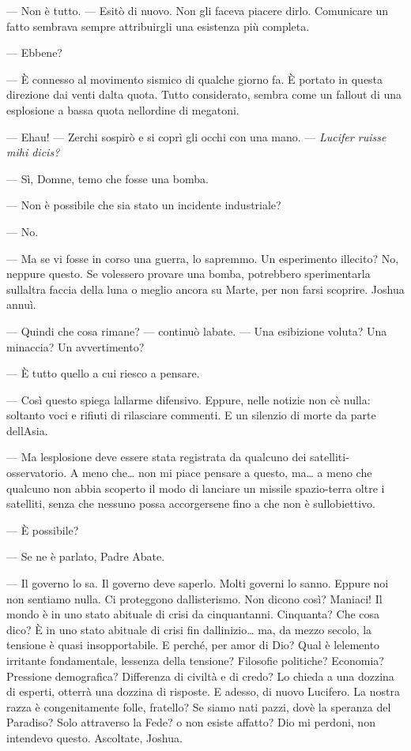	--- Non è tutto. --- Esitò di nuovo. Non gli faceva piacere dirlo.
	Comunicare un fatto sembrava sempre attribuirgli una esistenza più
	completa.
	
	--- Ebbene?
	
	--- È connesso al movimento sismico di qualche giorno fa. È portato in
	questa direzione dai venti d\textquotesingle alta quota. Tutto
	considerato, sembra come un fallout di una esplosione a bassa quota
	nell\textquotesingle ordine di megatoni.
	
	--- Ehau! --- Zerchi sospirò e si coprì gli occhi con una mano. ---
	\emph{Lucifer ruisse mihi dicis?}
	
	--- Sì, Domne, temo che fosse una bomba.
	
	--- Non è possibile che sia stato un incidente industriale?
	
	--- No.
	
	--- Ma se vi fosse in corso una guerra, lo sapremmo. Un esperimento
	illecito? No, neppure questo. Se volessero provare una bomba, potrebbero
	sperimentarla sull\textquotesingle altra faccia della luna o meglio
	ancora su Marte, per non farsi scoprire. Joshua annuì.
	
	--- Quindi che cosa rimane? --- continuò l\textquotesingle abate. ---
	Una esibizione voluta? Una minaccia? Un avvertimento?
	
	--- È tutto quello a cui riesco a pensare.
	
	--- Così questo spiega l\textquotesingle allarme difensivo. Eppure,
	nelle notizie non c\textquotesingle è nulla: soltanto voci e rifiuti di
	rilasciare commenti. E un silenzio di morte da parte
	dell\textquotesingle Asia.
	
	--- Ma l\textquotesingle esplosione deve essere stata registrata da
	qualcuno dei satelliti-osservatorio. A meno che\ldots{} non mi piace
	pensare a questo, ma\ldots{} a meno che qualcuno non abbia scoperto il
	modo di lanciare un missile spazio-terra oltre i satelliti, senza che
	nessuno possa accorgersene fino a che non è
	sull\textquotesingle obiettivo.
	
	--- È possibile?
	
	--- Se ne è parlato, Padre Abate.
	
	--- Il governo lo sa. Il governo deve saperlo. Molti governi lo sanno.
	Eppure noi non sentiamo nulla. Ci proteggono
	dall\textquotesingle isterismo. Non dicono così? Maniaci! Il mondo è in
	uno stato abituale di crisi da cinquant\textquotesingle anni. Cinquanta?
	Che cosa dico? È in uno stato abituale di crisi fin
	dall\textquotesingle inizio\ldots{} ma, da mezzo secolo, la tensione è
	quasi insopportabile. E perché, per amor di Dio? Qual è
	l\textquotesingle elemento irritante fondamentale,
	l\textquotesingle essenza della tensione? Filosofie politiche? Economia?
	Pressione demografica? Differenza di civiltà e di credo? Lo chieda a una
	dozzina di esperti, otterrà una dozzina di risposte. E adesso, di nuovo
	Lucifero. La nostra razza è congenitamente folle, fratello? Se siamo
	nati pazzi, dov\textquotesingle è la speranza del Paradiso? Solo
	attraverso la Fede? o non esiste affatto? Dio mi perdoni, non intendevo
	questo. Ascoltate, Joshua.
	
